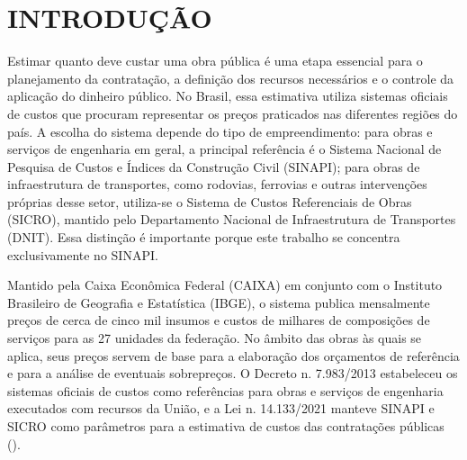 
\section{INTRODUÇÃO}

Estimar quanto deve custar uma obra pública é uma etapa essencial para o planejamento da 
contratação, a definição dos recursos necessários e o controle da aplicação do dinheiro 
público. No Brasil, essa estimativa utiliza sistemas oficiais de custos que procuram 
representar os preços praticados nas diferentes regiões do país. A escolha do sistema 
depende do tipo de empreendimento: para obras e serviços de engenharia em geral, a 
principal referência é o Sistema Nacional de Pesquisa de Custos e Índices da Construção 
Civil (SINAPI); para obras de infraestrutura de transportes, como rodovias, ferrovias e 
outras intervenções próprias desse setor, utiliza-se o Sistema de Custos Referenciais de 
Obras (SICRO), mantido pelo Departamento Nacional de Infraestrutura de Transportes (DNIT). 
Essa distinção é importante porque este trabalho se concentra exclusivamente no SINAPI.

Mantido pela Caixa Econômica Federal (CAIXA) em conjunto com o Instituto Brasileiro de 
Geografia e Estatística (IBGE), o sistema publica mensalmente preços de cerca de cinco 
mil insumos e custos de milhares de composições de serviços para as 27 unidades da 
federação. No âmbito das obras às quais se aplica, seus preços servem de base para a 
elaboração dos orçamentos de referência e para a análise de eventuais sobrepreços. O 
Decreto n. 7.983/2013 estabeleceu os sistemas oficiais de custos como referências para 
obras e serviços de engenharia executados com recursos da União, e a Lei n. 14.133/2021 
manteve SINAPI e SICRO como parâmetros para a estimativa de custos das contratações 
públicas ().

